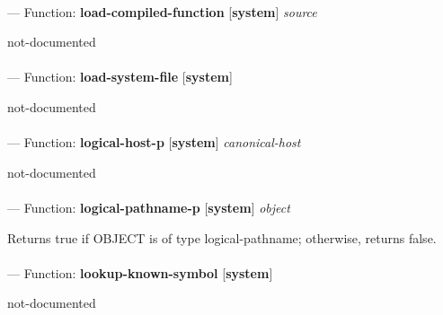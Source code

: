 \paragraph{}
\label{SYSTEM:LOAD-COMPILED-FUNCTION}
--- Function: \textbf{load-compiled-function} [\textbf{system}] \textit{source}

\begin{adjustwidth}{5em}{5em}
not-documented
\end{adjustwidth}

\paragraph{}
\label{SYSTEM:LOAD-SYSTEM-FILE}
--- Function: \textbf{load-system-file} [\textbf{system}] \textit{}

\begin{adjustwidth}{5em}{5em}
not-documented
\end{adjustwidth}

\paragraph{}
\label{SYSTEM:LOGICAL-HOST-P}
--- Function: \textbf{logical-host-p} [\textbf{system}] \textit{canonical-host}

\begin{adjustwidth}{5em}{5em}
not-documented
\end{adjustwidth}

\paragraph{}
\label{SYSTEM:LOGICAL-PATHNAME-P}
--- Function: \textbf{logical-pathname-p} [\textbf{system}] \textit{object}

\begin{adjustwidth}{5em}{5em}
Returns true if OBJECT is of type logical-pathname; otherwise, returns false.
\end{adjustwidth}

\paragraph{}
\label{SYSTEM:LOOKUP-KNOWN-SYMBOL}
--- Function: \textbf{lookup-known-symbol} [\textbf{system}] \textit{}

\begin{adjustwidth}{5em}{5em}
not-documented
\end{adjustwidth}

